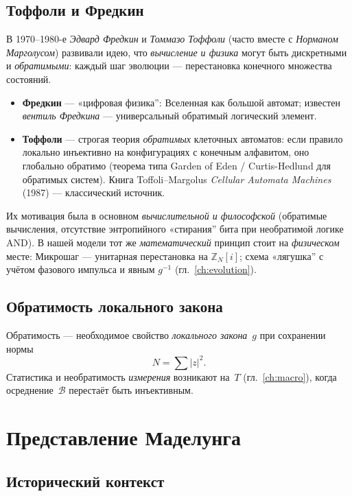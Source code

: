 \subsection{Тоффоли и Фредкин}

В 1970--1980-е \emph{Эдвард Фредкин} и \emph{Томмазо Тоффоли}
(часто вместе с \emph{Норманом Марголусом}) развивали идею, что
\emph{вычисление и физика} могут быть дискретными и \emph{обратимыми}:
каждый шаг эволюции --- перестановка конечного множества состояний.

\begin{itemize}
\item \textbf{Фредкин} --- «цифровая физика'': Вселенная как большой автомат;
  известен \emph{вентиль Фредкина} --- универсальный обратимый логический элемент.
\item \textbf{Тоффоли} --- строгая теория \emph{обратимых} клеточных автоматов:
  если правило локально инъективно на конфигурациях с конечным алфавитом,
  оно глобально обратимо (теорема типа Garden of Eden / Curtis-Hedlund для обратимых систем).
  Книга Toffoli--Margolus \emph{Cellular Automata Machines} (1987) --- классический источник.
\end{itemize}

Их мотивация была в основном \emph{вычислительной и философской}
(обратимые вычисления, отсутствие энтропийного «стирания'' бита при необратимой логике AND).
В нашей модели тот же \emph{математический} принцип стоит на \emph{физическом} месте:
Микрошаг --- унитарная перестановка на $\mathbb{Z}_N[i]$;
схема «лягушка'' с учётом фазового импульса и явным $g^{-1}$ (гл.~\ref{ch:evolution}).

\subsection{Обратимость локального закона}

Обратимость --- необходимое свойство \emph{локального закона}~$g$ при сохранении нормы
\[
N=\sum|z|^2.
\]
Статистика и необратимость \emph{измерения} возникают на~$T$ (гл.~\ref{ch:macro}),
когда осреднение~$\mathcal{B}$ перестаёт быть инъективным.

\section{Представление Маделунга}

\subsection{Исторический контекст}


